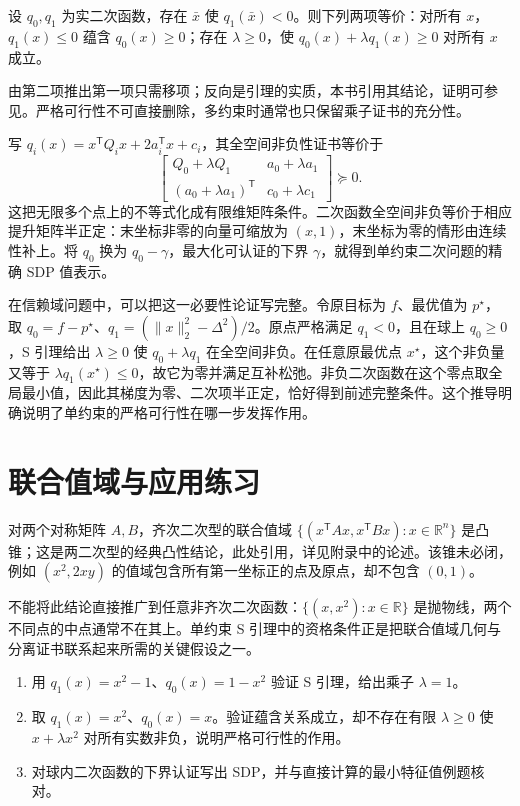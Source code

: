 \documentclass[UTF8,12pt,a4paper,fontset=fandol]{ctexbook}
\begin{document}
\begin{theorem}[S 引理]
设 $q_0,q_1$ 为实二次函数，存在 $\bar x$ 使 $q_1(\bar x)<0$。则下列两项等价：对所有 $x$，$q_1(x)\leq0$ 蕴含 $q_0(x)\geq0$；存在 $\lambda\geq0$，使 $q_0(x)+\lambda q_1(x)\geq0$ 对所有 $x$ 成立。
\end{theorem}
由第二项推出第一项只需移项；反向是引理的实质，本书引用其结论，证明可参见\cite{ahmadi-slemma}。严格可行性不可直接删除，多约束时通常也只保留乘子证书的充分性。

写 $q_i(x)=x^{\mathsf T}Q_i x+2a_i^{\mathsf T}x+c_i$，其全空间非负性证书等价于
\[
 \begin{bmatrix}
 Q_0+\lambda Q_1&a_0+\lambda a_1\\
 (a_0+\lambda a_1)^{\mathsf T}&c_0+\lambda c_1
 \end{bmatrix}\succeq0.
\]
这把无限多个点上的不等式化成有限维矩阵条件。二次函数全空间非负等价于相应提升矩阵半正定：末坐标非零的向量可缩放为 $(x,1)$，末坐标为零的情形由连续性补上。将 $q_0$ 换为 $q_0-\gamma$，最大化可认证的下界 $\gamma$，就得到单约束二次问题的精确 SDP 值表示。

在信赖域问题中，可以把这一必要性论证写完整。令原目标为 $f$、最优值为 $p^\star$，取 $q_0=f-p^\star$、$q_1=(\|x\|_2^2-\Delta^2)/2$。原点严格满足 $q_1<0$，且在球上 $q_0\geq0$，S 引理给出 $\lambda\geq0$ 使 $q_0+\lambda q_1$ 在全空间非负。在任意原最优点 $x^\star$，这个非负量又等于 $\lambda q_1(x^\star)\leq0$，故它为零并满足互补松弛。非负二次函数在这个零点取全局最小值，因此其梯度为零、二次项半正定，恰好得到前述完整条件。这个推导明确说明了单约束的严格可行性在哪一步发挥作用。

\section{联合值域与应用练习}

对两个对称矩阵 $A,B$，齐次二次型的联合值域 $\{(x^{\mathsf T}Ax,x^{\mathsf T}Bx):x\in\mathbb R^n\}$ 是凸锥；这是两二次型的经典凸性结论，此处引用，详见\cite{boyd-vandenberghe}附录中的论述。该锥未必闭，例如 $(x^2,2xy)$ 的值域包含所有第一坐标正的点及原点，却不包含 $(0,1)$。

不能将此结论直接推广到任意非齐次二次函数：$\{(x,x^2):x\in\mathbb R\}$ 是抛物线，两个不同点的中点通常不在其上。单约束 S 引理中的资格条件正是把联合值域几何与分离证书联系起来所需的关键假设之一。

\begin{enumerate}
 \item 用 $q_1(x)=x^2-1$、$q_0(x)=1-x^2$ 验证 S 引理，给出乘子 $\lambda=1$。
 \item 取 $q_1(x)=x^2$、$q_0(x)=x$。验证蕴含关系成立，却不存在有限 $\lambda\geq0$ 使 $x+\lambda x^2$ 对所有实数非负，说明严格可行性的作用。
 \item 对球内二次函数的下界认证写出 SDP，并与直接计算的最小特征值例题核对。
\end{enumerate}
\end{document}
